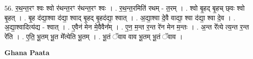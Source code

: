 \documentclass[17pt]{extarticle}
\begin{document}
56. र॒थ॒न्त॒रꣳ श्वः श्वो र॑थन्त॒रꣳ र॑थन्त॒रꣳ श्वः । . र॒थ॒न्त॒रमिति॑ रथम् - त॒रम् । . श्वो बृ॒हद् बृ॒हच् छ्‌वः श्वो बृ॒हत् । . बृ॒ह द॑द्या॒श्वा द॑द्या॒ श्वाद् बृ॒हद् बृ॒हद॑द्या॒ श्वात् । . अ॒द्या॒श्वा दे॒वै वाद्या॒ श्वा द॑द्या॒ श्वा दे॒व । . अ॒द्या॒श्वादित्य॑द्य - श्वात् । . ए॒वैन॑ मेन मे॒वैवैन᳚म् । . ए॒न॒ म॒न्त र॒न्त रे॑न मेन म॒न्तः । . अ॒न्त रे᳚त्ये त्य॒न्त र॒न्त रे॑ति । . ए॒ति॒ भू॒तम् भू॒त मे᳚त्येति भू॒तम् । . भू॒तं ॅवाव वाव भू॒तम् भू॒तं ॅवाव । \newline

\textbf{Ghana Paata } \newline
\end{document}
